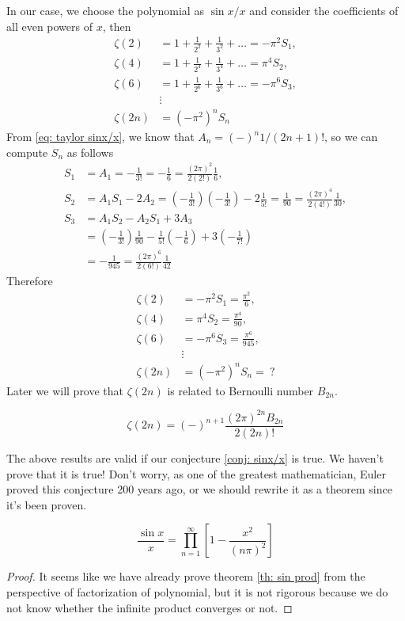 \documentclass[10pt]{article}
\begin{document}
In our case, we choose the polynomial as $\sin x /x$ and consider the coefficients of all even powers of $x$, then
\begin{align*}
	\zeta(2) &= 1 + \frac{1}{2^2} + \frac{1}{3^2} + \dots = - \pi^2 S_1, \\
	\zeta(4) &= 1 + \frac{1}{2^4} + \frac{1}{3^4} + \dots = \pi^4 S_2, \\
	\zeta(6) &= 1 + \frac{1}{2^6} + \frac{1}{3^6} + \dots = - \pi^6 S_3, \\
	&\vdots \\
	\zeta(2n) &= (-\pi^2)^n S_n
\end{align*}
From \eqref{eq: taylor sinx/x}, we know that $A_n = (-)^n 1/(2n+1)!$, so we can compute $S_n$ as follows
\begin{align*}
	S_1 &= A_1 = -\frac{1}{3!} = -\frac{1}{6} = \frac{(2\pi)^{2}}{2(2!)} \frac{1}{6}, \\
	S_2 &= A_1 S_1 - 2 A_2 =  \left(-\frac{1}{3!}\right)\left(-\frac{1}{3!}\right) - 2 \frac{1}{5!} = \frac{1}{90} = \frac{(2\pi)^{4}}{2(4!)} \frac{1}{30}, \\
	S_3 &= A_1 S_2 - A_2 S_1 + 3 A_3 \\
	&= \left(-\frac{1}{3!}\right) \frac{1}{90} - \frac{1}{5!} \left(- \frac{1}{6} \right) + 3 \left(-\frac{1}{7!}\right) \\
	&= -\frac{1}{945} = \frac{(2\pi)^{6}}{2(6!)} \frac{1}{42}
\end{align*}
Therefore
\begin{align*}
	\zeta(2) &= - \pi^2 S_1 = \frac{\pi^2}{6}, \\
	\zeta(4) &= \pi^4 S_2 = \frac{\pi^4}{90}, \\
	\zeta(6) &= - \pi^6 S_3 = \frac{\pi^6}{945}, \\
	&\vdots \\
	\zeta(2n) &= (-\pi^2)^n S_n = \ ?
\end{align*}
Later we will prove that $\zeta(2n)$ is related to Bernoulli number $B_{2n}$.
\begin{theorem}
	\begin{equation}
		\zeta(2n) = (-)^{n+1} \frac{(2\pi)^{2n} B_{2n}}{2(2n)!}
	\end{equation}
\end{theorem}
The above results are valid if our conjecture \eqref{conj: sinx/x} is true. We haven't prove that it is true! Don't worry, as one of the greatest mathematician, Euler proved this conjecture 200 years ago, or we should rewrite it as a theorem since it's been proven.
\begin{theorem} \label{th: sin prod}
	\begin{equation}
		\frac{\sin{x}}{x} = \prod_{n=1}^{\infty} \left[ 1 - \frac{x^2}{(n\pi)^2} \right]
	\end{equation}
\end{theorem}
\begin{proof}
	It seems like we have already prove theorem \ref{th: sin prod} from the perspective of factorization of polynomial, but it is not rigorous because we do not know whether the infinite product converges or not.
\end{proof}
\end{document}
